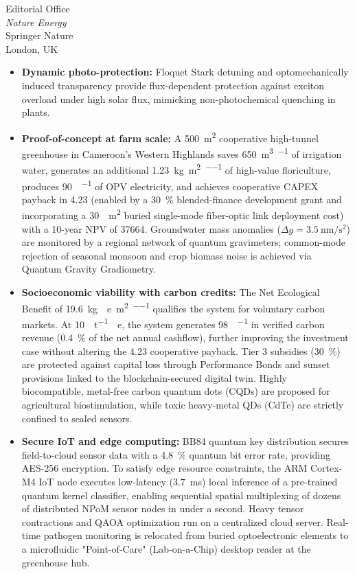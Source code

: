 \documentclass[12pt]{letter}
\begin{document}
\begin{letter}{Editorial Office\\
\textit{Nature Energy}\\
Springer Nature\\
London, UK}
\begin{itemize}
\item \textbf{Dynamic photo-protection:} Floquet Stark detuning and optomechanically induced transparency provide flux-dependent protection against exciton overload under high solar flux, mimicking non-photochemical quenching in plants.

\item \textbf{Proof-of-concept at farm scale:} A \qty{500}{\m\squared} cooperative high-tunnel greenhouse in Cameroon's Western Highlands saves \qty{650}{\m\cubed\per\yr} of irrigation water, generates an additional \qty{1.23}{\kg\per\m\squared\per\yr} of high-value floriculture, produces \qty{90}{\MWh\per\yr} of OPV electricity, and achieves cooperative CAPEX payback in \qty{4.23}{\yr} (enabled by a \qty{30}{\percent} blended-finance development grant and incorporating a \qty{30}{\per\m\squared} buried single-mode fiber-optic link deployment cost) with a 10-year NPV of \qty{+37664}{\USD}. Groundwater mass anomalies ($\Delta g = \qty{3.5}{\nm\per\s\squared}$) are monitored by a regional network of quantum gravimeters; common-mode rejection of seasonal monsoon and crop biomass noise is achieved via Quantum Gravity Gradiometry.

\item \textbf{Socioeconomic viability with carbon credits:} The Net Ecological Benefit of \qty{19.6}{\kg{}e\per\m\squared\per\yr} qualifies the system for voluntary carbon markets. At \qty{10}{\USD\per\tonne{}e}, the system generates \qty{98}{\USD\per\yr} in verified carbon revenue (\qty{0.4}{\percent} of the net annual cashflow), further improving the investment case without altering the \qty{4.23}{\yr} cooperative payback. Tier 3 subsidies (\qty{30}{\percent}) are protected against capital loss through Performance Bonds and sunset provisions linked to the blockchain-secured digital twin. Highly biocompatible, metal-free carbon quantum dots (CQDs) are proposed for agricultural biostimulation, while toxic heavy-metal QDs (CdTe) are strictly confined to sealed sensors.

\item \textbf{Secure IoT and edge computing:} BB84 quantum key distribution secures field-to-cloud sensor data with a \qty{4.8}{\percent} quantum bit error rate, providing AES-256 encryption. To satisfy edge resource constraints, the ARM Cortex-M4 IoT node executes low-latency (\qty{3.7}{\ms}) local inference of a pre-trained quantum kernel classifier, enabling sequential spatial multiplexing of dozens of distributed NPoM sensor nodes in under a second. Heavy tensor contractions and QAOA optimization run on a centralized cloud server. Real-time pathogen monitoring is relocated from buried optoelectronic elements to a microfluidic "Point-of-Care" (Lab-on-a-Chip) desktop reader at the greenhouse hub.
\end{itemize}


\end{letter}
\end{document}
